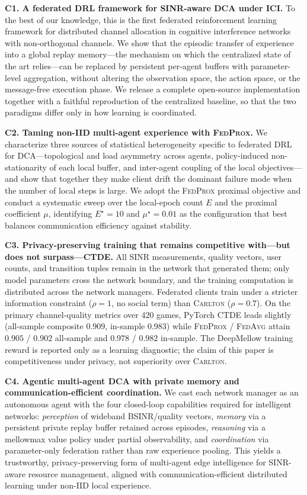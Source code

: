 \documentclass[journal]{IEEEtran}
\newcommand{\CARLTON}{\textsc{Carlton}}
\newcommand{\FedAvg}{\textsc{FedAvg}}
\newcommand{\FedProx}{\textsc{FedProx}}
\begin{document}
\textbf{C1. A federated DRL framework for SINR-aware DCA under ICI.} To the
best of our knowledge, this is the first federated reinforcement learning
framework for distributed channel allocation in cognitive interference networks
with non-orthogonal channels. We show that the episodic transfer of experience
into a global replay memory---the mechanism on which the centralized state of
the art relies---can be replaced by persistent per-agent buffers with
parameter-level aggregation, without altering the observation space, the action
space, or the message-free execution phase. We release a complete open-source
implementation together with a faithful reproduction of the centralized
baseline, so that the two paradigms differ only in how learning is coordinated.

\textbf{C2. Taming non-IID multi-agent experience with \FedProx{}.} We
characterize three sources of statistical heterogeneity specific to federated
DRL for DCA---topological and load asymmetry across agents, policy-induced
non-stationarity of each local buffer, and inter-agent coupling of the local
objectives---and show that together they make client drift the dominant failure
mode when the number of local steps is large. We adopt the \FedProx{} proximal
objective and conduct a systematic sweep over the local-epoch count $E$ and the
proximal coefficient $\mu$, identifying $E^{\star}=10$ and $\mu^{\star}=0.01$
as the configuration that best balances communication efficiency against
stability.

\textbf{C3. Privacy-preserving training that remains competitive with---but
does not surpass---CTDE.}
All SINR measurements, quality vectors, user counts, and transition tuples
remain in the network that generated them; only model parameters cross the
network boundary, and the training computation is distributed across the
network managers. Federated clients train under a stricter information
constraint ($\rho=1$, no social term) than \CARLTON{} ($\rho=0.7$). On the
primary channel-quality metrics over $420$ games, PyTorch CTDE leads slightly
(all-sample composite $0.909$, in-sample $0.983$) while \FedProx{} /
\FedAvg{} attain $0.905$ / $0.902$ all-sample and $0.978$ / $0.982$
in-sample. The DeepMellow training reward is reported only as a learning
diagnostic; the claim of this paper is competitiveness under privacy, not
superiority over \CARLTON{}.

\textbf{C4. Agentic multi-agent DCA with private memory and
communication-efficient coordination.}
We cast each network manager as an autonomous agent with the four closed-loop
capabilities required for intelligent networks: \emph{perception} of
wideband BSINR/quality vectors, \emph{memory} via a persistent private replay
buffer retained across episodes, \emph{reasoning} via a mellowmax value policy
under partial observability, and \emph{coordination} via parameter-only
federation rather than raw experience pooling. This yields a trustworthy,
privacy-preserving form of multi-agent edge intelligence for SINR-aware
resource management, aligned with communication-efficient distributed learning
under non-IID local experience.
\end{document}
